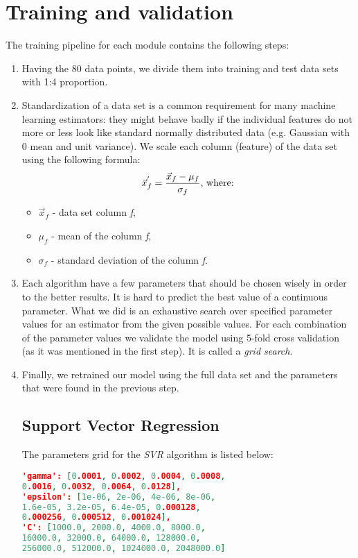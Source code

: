 \section{Training and validation}
The training pipeline for each module contains the following steps:
\begin{enumerate}
	\item Having the 80 data points, we divide them into training and test data sets with 1:4 proportion.
	\item Standardization of a data set is a common requirement for many machine learning estimators: they might behave badly if the individual features do not more or less look like standard normally distributed data (e.g. Gaussian with 0 mean and unit variance)\cite{scaler}. We scale each column (feature) of the data set using the following formula:
	\[ \vec{x}_{f}^{'} = \frac{\vec{x}_{f}-\mu_f}{\sigma_f} \textnormal{, where:}\]
	\begin{itemize}
		\item $ \vec{x}_{f} $ - data set column \textit{f},
		\item $ \mu_f $ - mean of the column \textit{f},
		\item $ \sigma_f $ - standard deviation of the column \textit{f}.
	\end{itemize}
	\item Each algorithm have a few parameters that should be chosen wisely in order to the better results. It is hard to predict the best value of a continuous parameter. What we did is an exhaustive search over specified parameter values for an estimator from the given possible values. For each combination of the parameter values we validate the model using 5-fold cross validation (as it was mentioned in the first step). It is called a \textit{grid search}\cite{grid_search}.
	\item Finally, we retrained our model using the full data set and the parameters that were found in the previous step.
	\subsection{Support Vector Regression}
	The parameters grid for the \textit{SVR} algorithm is listed below:
	\begin{lstlisting}[language=json,firstnumber=1]
'gamma': [0.0001, 0.0002, 0.0004, 0.0008, 
0.0016, 0.0032, 0.0064, 0.0128], 
'epsilon': [1e-06, 2e-06, 4e-06, 8e-06, 
1.6e-05, 3.2e-05, 6.4e-05, 0.000128, 
0.000256, 0.000512, 0.001024], 
'C': [1000.0, 2000.0, 4000.0, 8000.0,
16000.0, 32000.0, 64000.0, 128000.0, 
256000.0, 512000.0, 1024000.0, 2048000.0]
	\end{lstlisting}
	

\end{enumerate}
